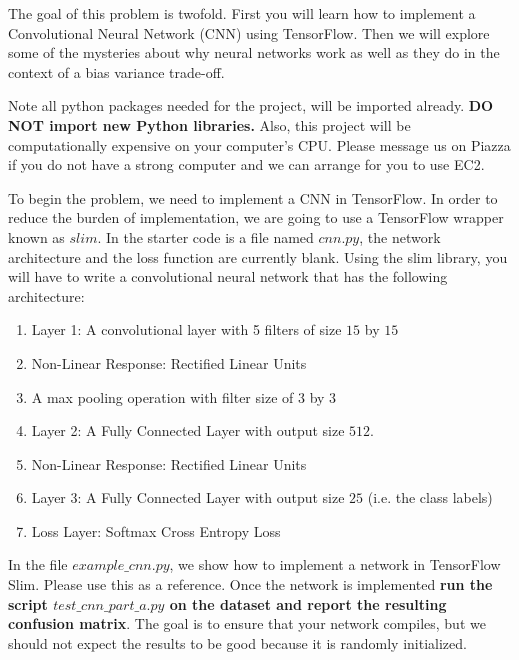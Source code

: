 The goal of this problem is twofold. First you will learn how to implement a Convolutional Neural Network (CNN) using TensorFlow. Then we will explore some of the mysteries about why neural networks work as well as they do in the context of a bias variance trade-off.

Note all python packages needed for the project, will be imported already. {\bf DO NOT import new Python libraries.} Also, this project will be computationally expensive on your computer's CPU. Please message us on Piazza if you do not have a strong computer and we can arrange for you to use EC2.



\begin{Parts}
\Part To begin the problem, we need to implement a CNN in TensorFlow. In order to reduce the burden of implementation, we are going to use a TensorFlow wrapper known as $slim$.   In the starter code is a file named $cnn.py$, the network architecture and the loss function are currently blank. Using the slim library, you will have to write a convolutional neural network that has the following architecture:

\begin{enumerate}
\item Layer 1: A convolutional layer with 5 filters of size $15$ by $15$
\item Non-Linear Response: Rectified Linear Units
\item A max pooling operation with filter size of $3$ by $3$
\item Layer 2: A Fully Connected Layer with output size $512$.
\item Non-Linear Response: Rectified Linear Units
\item Layer 3: A Fully Connected Layer with output size $25$ (i.e. the class labels)
\item Loss Layer: Softmax Cross Entropy Loss
\end{enumerate}


In the file $example\_cnn.py$, we show how to implement a network in TensorFlow Slim. Please use this as a reference. Once the network is implemented {\bf run the script $test\_cnn\_part\_a.py$ on the dataset and report the resulting confusion matrix}.  The goal is to ensure that your network compiles, but we should not expect the results to be good because it is randomly initialized.








\end{Parts}
